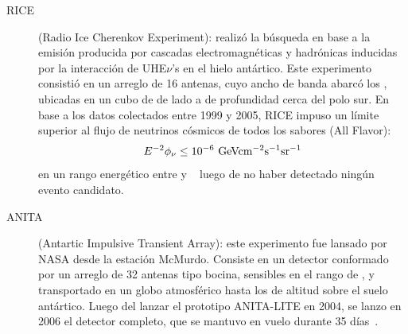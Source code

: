 	\begin{description}
	 \item[RICE] (Radio Ice Cherenkov Experiment): realiz\'o la b\'usqueda en base a la emisi\'on producida por cascadas electromagn\'eticas y hadr\'onicas inducidas por la interacci\'on de UHE$\nu$'s en el hielo ant\'artico.
	 Este experimento consisti\'o en un arreglo de 16 antenas, cuyo ancho de banda abarc\'o los , ubicadas en un cubo de  de lado a  de profundidad cerca del polo sur.
	 En base a los datos colectados entre 1999 y 2005, RICE impuso un l\'imite superior al flujo de neutrinos c\'osmicos de todos los sabores (All Flavor):
	 \begin{equation}
	 E^{-2}\phi_\nu \leq 10^{-6}{\rm\ GeVcm^{-2}s^{-1}sr^{-1}}
	 \end{equation}
	 en un rango energ\'etico entre  y ~\cite{cite:RICE} luego de no haber detectado ning\'un evento candidato.
	 \item[ANITA] (Antartic Impulsive Transient Array): este experimento fue lansado por NASA desde la estaci\'on McMurdo. 
	 Consiste en un detector conformado por un arreglo de 32 antenas tipo bocina, sensibles en el rango de , y transportado en un globo atmosf\'erico hasta los  de altitud sobre el suelo ant\'artico.
	 Luego del lanzar el prototipo ANITA-LITE en 2004, se lanzo en 2006 el detector completo, que se mantuvo en vuelo durante 35 d\'ias~\cite{cite:Anita1}.
	 

\end{description}
